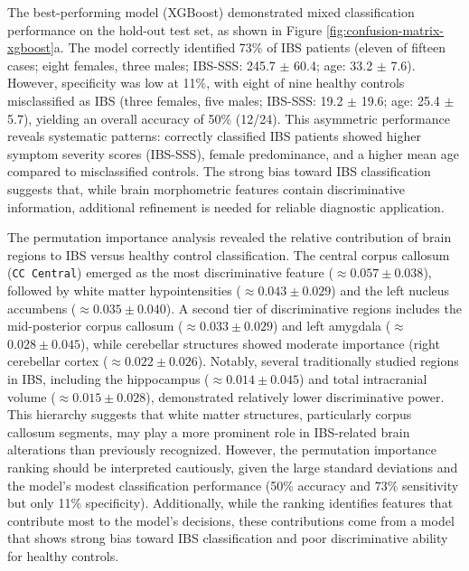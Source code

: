 \documentclass[diagnostics,article,accept,pdftex,moreauthors]{Definitions/mdpi}
\begin{document}
The best-performing model (XGBoost) demonstrated mixed classification performance on the hold-out test set, as shown in Figure \ref{fig:confusion-matrix-xgboost}a. The model correctly identified 73\% of IBS patients (eleven of fifteen cases; eight females, three males; IBS-SSS: 245.7 $\pm$ 60.4; age: 33.2 $\pm$ 7.6). However, specificity was low at 11\%, with eight of nine healthy controls misclassified as IBS (three females, five males; IBS-SSS: 19.2 $\pm$ 19.6; age: 25.4 $\pm$ 5.7), yielding an overall accuracy of 50\% (12/24). This asymmetric performance reveals systematic patterns: correctly classified IBS patients showed higher symptom severity scores (IBS-SSS), female predominance, and a higher mean age compared to misclassified controls. The strong bias toward IBS classification suggests that, while brain morphometric features contain discriminative information, additional refinement is needed for reliable diagnostic application.




The permutation importance analysis revealed the relative contribution of brain regions to IBS versus healthy control classification. The central corpus callosum (\texttt{CC Central}) emerged as the most discriminative feature ($\approx$$0.057 \pm 0.038$), followed by white matter hypointensities ($\approx$$0.043 \pm 0.029$) and the left nucleus accumbens ($\approx$$0.035 \pm 0.040$). A second tier of discriminative regions includes the mid-posterior corpus callosum \mbox{($\approx$$0.033 \pm 0.029$)} and left amygdala ($\approx$$0.028 \pm 0.045$), while cerebellar structures showed moderate importance (right cerebellar cortex ($\approx$$0.022 \pm 0.026$). Notably, several traditionally studied regions in IBS, including the hippocampus ($\approx$$0.014 \pm 0.045$) and total intracranial volume ($\approx$$0.015 \pm 0.028$), demonstrated relatively lower discriminative power. This hierarchy suggests that white matter structures, particularly corpus callosum segments, may play a more prominent role in IBS-related brain alterations than previously recognized. However, the permutation importance ranking should be interpreted cautiously, given the large standard deviations and the model's modest classification performance (50\% accuracy and 73\% sensitivity but only 11\% specificity). Additionally, while the ranking identifies features that contribute most to the model's decisions, these contributions come from a model that shows strong bias toward IBS classification and poor discriminative ability for healthy controls.
\end{document}
